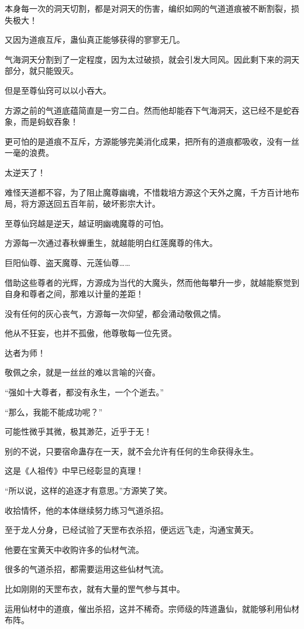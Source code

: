 \begin{this_body}
本身每一次的洞天切割，都是对洞天的伤害，编织如网的气道道痕被不断割裂，损失极大！

又因为道痕互斥，蛊仙真正能够获得的寥寥无几。

气海洞天分割到了一定程度，因为太过破损，就会引发大同风。因此剩下来的洞天部分，就只能毁灭。

但是至尊仙窍可以以小吞大。

方源之前的气道底蕴简直是一穷二白。然而他却能吞下气海洞天，这已经不是蛇吞象，而是蚂蚁吞象！

更可怕的是道痕不互斥，方源能够完美消化成果，把所有的道痕都吸收，没有一丝一毫的浪费。

太逆天了！

难怪天道都不容，为了阻止魔尊幽魂，不惜栽培方源这个天外之魔，千方百计地布局，将方源送回五百年前，破坏影宗大计。

至尊仙窍越是逆天，越证明幽魂魔尊的可怕。

方源每一次通过春秋蝉重生，就越能明白红莲魔尊的伟大。

巨阳仙尊、盗天魔尊、元莲仙尊……

借助这些尊者的光辉，方源成为当代的大魔头，然而他每攀升一步，就越能察觉到自身和尊者之间，那难以计量的差距！

没有任何的灰心丧气，方源每一次仰望，都会涌动敬佩之情。

他从不狂妄，也并不孤傲，他尊敬每一位先贤。

达者为师！

敬佩之余，就是一丝丝的难以言喻的兴奋。

“强如十大尊者，都没有永生，一个个逝去。”

“那么，我能不能成功呢？”

可能性微乎其微，极其渺茫，近乎于无！

别的不说，只要宿命蛊存在一天，就不会允许有任何的生命获得永生。

这是《人祖传》中早已经彰显的真理！

“所以说，这样的追逐才有意思。”方源笑了笑。

收拾情怀，他的本体继续努力练习气道杀招。

至于龙人分身，已经试验了天罡布衣杀招，便远远飞走，沟通宝黄天。

他要在宝黄天中收购许多的仙材气流。

很多的气道杀招，都需要运用这些仙材气流。

比如刚刚的天罡布衣，就有大量的罡气参与其中。

运用仙材中的道痕，催出杀招，这并不稀奇。宗师级的阵道蛊仙，就能够利用仙材布阵。


\end{this_body}
